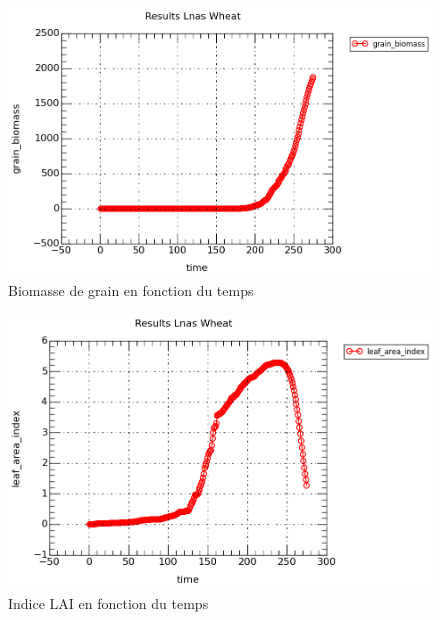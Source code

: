 \begin{figure}[h]

\begin{center}
 \includegraphics[scale = 0.5]{./img/grain.png}
 \caption{Biomasse de grain en fonction du temps}
 \label{fig:resultatGrain}
\end{center}

\end{figure}

\begin{figure}[h]

\begin{center}
 \includegraphics[scale = 0.5]{./img/LAI.png}
 \caption{Indice LAI en fonction du temps}
 \label{fig:resultatLAI}
\end{center}

\end{figure}

